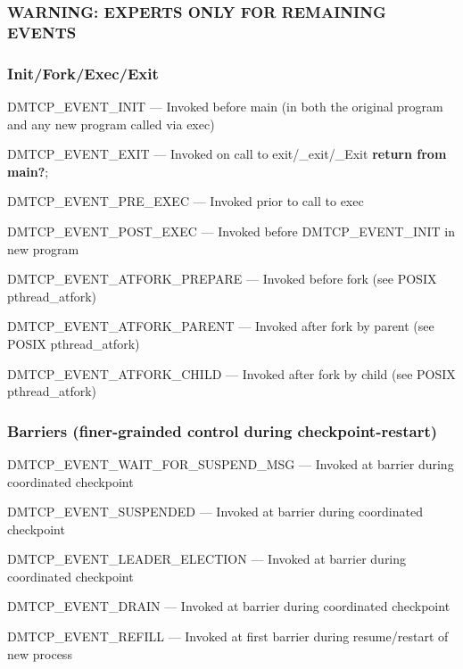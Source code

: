 \documentclass{article}
\begin{document}
\subsubsection*{WARNING:  EXPERTS ONLY FOR REMAINING EVENTS}
\subsubsection*{Init/Fork/Exec/Exit}
\begin{list}{}{\leftmargin=3em \itemindent=-2em}
\item
  DMTCP\_EVENT\_INIT --- Invoked before main (in both the original program
and any new program called via exec)
\item
  DMTCP\_EVENT\_EXIT --- Invoked on call to exit/\_exit/\_Exit {\bf return from main?};
\item
  DMTCP\_EVENT\_PRE\_EXEC --- Invoked prior to call to exec
\item
  DMTCP\_EVENT\_POST\_EXEC --- Invoked before DMTCP\_EVENT\_INIT in new program
\item
  DMTCP\_EVENT\_ATFORK\_PREPARE --- Invoked before fork (see POSIX pthread\_atfork)
\item
  DMTCP\_EVENT\_ATFORK\_PARENT --- Invoked after fork by parent (see POSIX
    pthread\_atfork)
\item
  DMTCP\_EVENT\_ATFORK\_CHILD --- Invoked after fork by child (see POSIX
    pthread\_atfork) \\
\end{list}

\subsubsection*{Barriers (finer-grainded control during checkpoint-restart)}
\begin{list}{}{\leftmargin=3em \itemindent=-2em}
\item
  DMTCP\_EVENT\_WAIT\_FOR\_SUSPEND\_MSG --- Invoked at barrier during
coordinated checkpoint
\item
  DMTCP\_EVENT\_SUSPENDED --- Invoked at barrier during coordinated checkpoint
\item
  DMTCP\_EVENT\_LEADER\_ELECTION --- Invoked at barrier during coordinated checkpoint
\item
  DMTCP\_EVENT\_DRAIN --- Invoked at barrier during coordinated checkpoint
\item
  DMTCP\_EVENT\_REFILL --- Invoked at first barrier during resume/restart of new process
\end{list}
\end{document}
